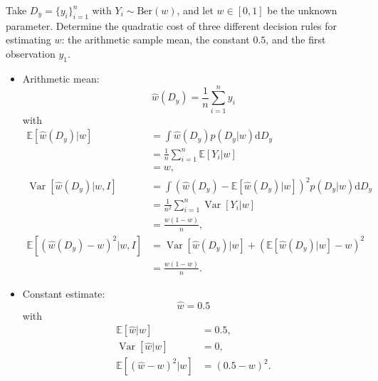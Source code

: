 \begin{example}
	Take $D_y= \{y_i\}_{i=1}^n$ with $Y_i \sim \mathrm{Ber}(w)$, and let $w\in [0,1]$ be the unknown parameter. Determine the quadratic cost of three different decision rules for estimating $w$: the arithmetic sample mean, the constant $0.5$, and the first observation $y_1$.
	
	\begin{itemize}
		\item Arithmetic mean:
		\begin{equation}
			\hat{w}(D_y) = \frac{1}{n} \sum_{i=1}^n y_i
		\end{equation}
		with
		\begin{equation}
			\begin{split}
				\mathbb{E}[\hat{w}(D_y)|w] &=  \int \hat{w}(D_y) p(D_y|w) \mathrm{d}D_y\\
				& = \frac{1}{n} \sum_{i=1}^n \mathbb{E}[Y_{i}|w]\\
				& = w,\\
				\operatorname{Var}[\hat{w}(D_y)|w,I] & =\int  (\hat{w}(D_y)-\mathbb{E}[\hat{w}(D_y)|w])^2 p(D_y|w) \mathrm{d}D_y\\
				 &= \frac{1}{n^2} \sum_{i=1}^n \operatorname{Var}[Y_{i}|w]\\
				 & = \frac{w(1-w)}{n},\\
				\mathbb{E}[(\hat{w}(D_y)-w)^2|w,I] &= \operatorname{Var}[\hat{w}(D_y)|w]+(\mathbb{E}[\hat{w}(D_y)|w]-w)^2\\
				& = \frac{w(1-w)}{n}.
			\end{split}
		\end{equation}
		
		\item Constant estimate:
		\begin{equation}
			\hat{w} = 0.5
		\end{equation}
		with
		\begin{equation}
			\begin{split}
				\mathbb{E}[\hat{w}|w] &= 0.5,\\
				\operatorname{Var}[\hat{w}|w] &= 0,\\
				\mathbb{E}[(\hat{w}-w)^2|w] &= (0.5 - w)^2.
			\end{split}
		\end{equation}
		

\end{itemize}
\end{example}
